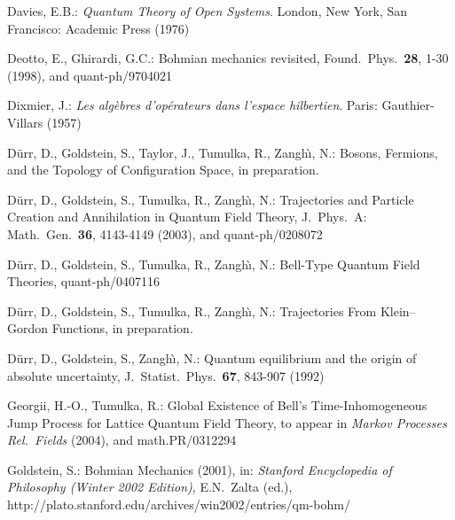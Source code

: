 \documentclass[12pt]{article}
\newcommand{\1}{\mathbf{1}} %
\begin{document}
\begin{thebibliography}{28.}
 Davies, E.B.: \textit{Quantum Theory of Open Systems}.
   London, New York, San Francisco: Academic Press (1976)

 Deotto, E., Ghirardi, G.C.: Bohmian mechanics
   revisited, Found.\ Phys.\ \textbf{28}, 1-30 (1998), and
   quant-ph/9704021


 Dixmier, J.: \textit{Les alg\`ebres d'op\'erateurs
   dans l'espace hilbertien}. Paris: Gauthier-Villars (1957)

 D\"urr, D., Goldstein, S., Taylor, J., Tumulka,
   R., Zangh{\`\i}, N.: Bosons, Fermions, and the Topology of
   Configuration Space, in preparation.

 D\"urr, D., Goldstein, S., Tumulka, R., Zangh{\`\i},
   N.: Trajectories and Particle Creation and Annihilation in Quantum
   Field Theory, J.\ Phys.\ A: Math.\ Gen.\ \textbf{36}, 4143-4149
   (2003), and quant-ph/0208072

 D\"urr, D., Goldstein, S., Tumulka, R., Zangh{\`\i},
   N.: Bell-Type Quantum Field Theories, quant-ph/0407116



 D\"urr, D., Goldstein, S., Tumulka, R., Zangh{\`\i},
   N.: Trajectories From Klein--Gordon Functions, in preparation.

 D\"urr, D., Goldstein, S., Zangh{\`\i}, N.: Quantum
   equilibrium and the origin of absolute uncertainty, J.\ Statist.\
   Phys.\ \textbf{67}, 843-907 (1992)

 Georgii, H.-O., Tumulka, R.: Global Existence of Bell's
   Time-Inhomogeneous Jump Process for Lattice Quantum Field Theory, to
   appear in \textit{Markov Processes Rel.\ Fields} (2004), and
   math.PR/0312294

 Goldstein, S.: Bohmian Mechanics (2001), in:
   \textit{Stanford Encyclopedia of Philosophy (Winter 2002 Edition)},
   E.N.~Zalta (ed.), \newline
   http://plato.stanford.edu/archives/win2002/entries/qm-bohm/


\end{thebibliography}
\end{document}

